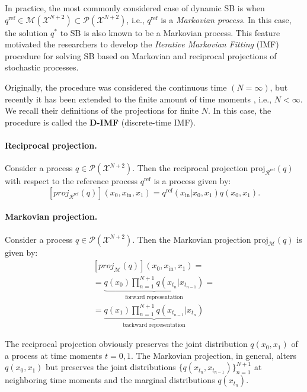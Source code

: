 In practice, the most commonly considered case of dynamic SB is when $q^{\text{ref}}\in\mathcal{M}(\mathcal{X}^{N+2})\subset \mathcal{P}(\mathcal{X}^{N+2})$, i.e., $q^{\text{ref}}$ is a \textit{Markovian process}. In this case, the solution $q^{*}$ to SB is also known to be a Markovian process. This feature motivated the researchers to develop the \textit{Iterative Markovian Fitting} (IMF) procedure for solving SB based on Markovian and reciprocal projections of stochastic processes.

Originally, the procedure \citep{peluchetti2023diffusion,shi2023diffusion} was considered the continuous time $(N=\infty)$, but recently it has been extended to the finite amount of time moments \citep{gushchin2024adversarial}, i.e., $N<\infty$. We recall their definitions of the projections for finite $N$. In this case, the procedure is called the \textbf{D-IMF} (discrete-time IMF).

\paragraph{Reciprocal projection.} Consider a process $q\!\in\! \mathcal{P}(\mathcal{X}^{N+2})$. Then the reciprocal projection $\text{proj}_{\mathcal{R}^{\text{ref}}}(q)$ with respect to the reference process $q^{\text{ref}}$ is a process given by:
\begin{equation}
    \label{eq:recip_proj}
    \left[proj_{\mathcal{R}^{\text{ref}}}(q)\right](x_0, x_{\text{in}}, x_1) = q^{\text{ref}}(x_{\text{in}}| x_0, x_1)q(x_0, x_1)
    \nonumber.
\end{equation}

\paragraph{Markovian projection.} Consider a process ${q\!\in \!\mathcal{P}(\mathcal{X}^{N+2})}$. Then the Markovian projection $\text{proj}_{\mathcal{M}}(q)$ is given by:
\begin{multline}
    \left[proj_{\mathcal{M}}(q)\right](x_0, x_{\text{in}}, x_1) = \\ = \underbrace{q(x_0)\prod_{n=1}^{N+1}q(x_{t_{n}}|x_{t_{n-1}})}_{\text{forward representation}} = \\ = \underbrace{q(x_1)\prod_{n=1}^{N+1}q(x_{t_{n-1}}|x_{t_{n}})}_{\text{backward representation}}
    \label{eq:markov_proj}
\end{multline}

The reciprocal projection obviously preserves the joint distribution $q(x_0,x_1)$ of a process at time moments $t=0,1$. The Markovian projection, in general, alters $q(x_0,x_1)$ but preserves the joint distributions $\{q(x_{t_n},x_{t_{n-1}})\}_{n=1}^{N+1}$ at neighboring time moments and the marginal distributions $q(x_{t_{n}})$.

